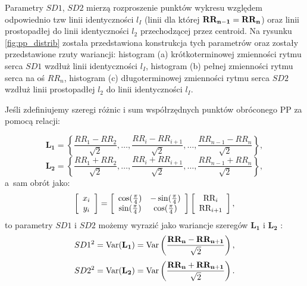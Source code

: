 

Parametry $SD1$, $SD2$ mierzą rozproszenie punktów wykresu
\PP{} względem odpowiednio tzw linii identyczności $l_{I}$ (linii dla której $\mathbf{RR_{n-1}} = \mathbf{RR_n}$)
oraz linii prostopadłej do linii identyczności $l_2$ przechodzącej przez centroid. Na
rysunku \ref{fig:pp_distrib} została przedstawiona konstrukcja tych parametrów oraz zostały
przedstawione rzuty wariancji: histogram (a) krótkoterminowej zmienności rytmu serca $SD1$
wzdłuż linii identyczności $l_{I}$, histogram (b) pełnej zmienności rytmu serca na oś $RR_n$,
histogram (c) długoterminowej zmienności rytmu serca $SD2$ wzdłuż linii prostopadłej $l_2$
do linii identyczności $l_{I}$.

Jeśli zdefiniujemy szeregi różnic i sum współrzędnych punktów obróconego PP za pomocą
relacji:


\begin{equation}
\mathbf{L_1} = \left \{ \frac{RR_1 - RR_{2}}{\sqrt{2}}, \ldots, \frac{RR_i - RR_{i+1}}{\sqrt{2}}, \ldots, \frac{RR_{n-1} - RR_{n}}{\sqrt{2}} \right \},
\end{equation}
\begin{equation}
\mathbf{L_2} = \left \{\frac{RR_1 + RR_{2}}{\sqrt{2}}, \ldots, \frac{RR_i + RR_{i+1}}{\sqrt{2}}, \ldots, \frac{RR_{n-1} + RR_{n}}{\sqrt{2}} \right \},
\end{equation}
a~sam obrót jako:
\begin{equation}
\left[
    \begin{array}{c}
      x_i\\
      y_i\\
    \end{array} \right] 
  = 
\left[ \begin{array}{c c}
      \cos(\frac{\pi}{4}) & -\sin(\frac{\pi}{4})\\
      \sin(\frac{\pi}{4}) & \cos(\frac{\pi}{4})\\
    \end{array} \right] 
\left[
    \begin{array}{c}
      \mbox{RR}_i\\
      \mbox{RR}_{i+1}\\
    \end{array} \right],
\end{equation}
to parametry $SD1$ i $SD2$ możemy wyrazić jako wariancje szeregów $\mathbf{L_1}$ i $\mathbf{L_2}$ \cite{poinc_jaro,jarek2}:
\begin{equation}
  SD1^2 = \mbox{Var}( \mathbf{L_1})
  = \mbox{Var}\left(\frac{\mathbf{RR_n} - \mathbf{RR_{n+1}}}{\sqrt{2}}\right),
  \label{eq:sd1}
\end{equation}
\begin{equation}
  SD2^2 = \mbox{Var}( \mathbf{L_2})
  = \mbox{Var}\left(\frac{\mathbf{RR_n} + \mathbf{RR_{n+1}}}{\sqrt{2}}\right). 
  \label{eq:sd2}
\end{equation}

